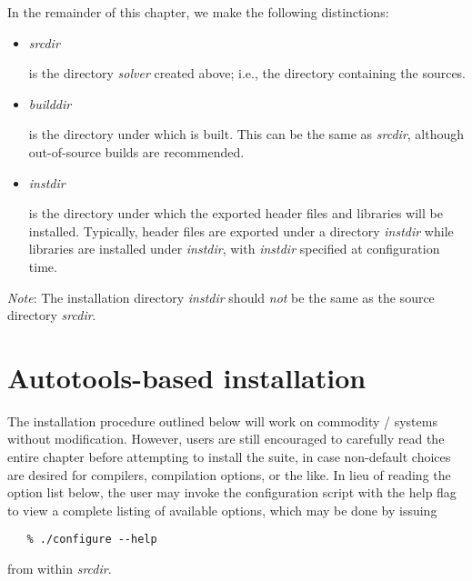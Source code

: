 \noindent In the remainder of this chapter, we make the following distinctions:
\begin{itemize}

\item {\em srcdir} 

  is the directory {\em solver} created above; i.e., the 
  directory containing the {\sundials} sources.

\item {\em builddir}

  is the directory under which {\sundials} is built. This can be the same as
  {\em srcdir}, although out-of-source builds are recommended.

\item {\em instdir}

  is the directory under which the {\sundials} exported header files
  and libraries will be installed. Typically, header files are exported under a directory
  {\em instdir} while libraries are installed under {\em instdir},
  with {\em instdir} specified at configuration time.

\end{itemize}
{\noindent}{\warn}{\em Note}: The installation directory {\em instdir} should {\em not} be the same as
the source directory {\em srcdir}.



\section{Autotools-based installation}



The installation procedure outlined below will work on commodity {\linux}/{\unix} 
systems without modification. However, users are still encouraged to carefully read 
the entire chapter before attempting to install the {\sundials} suite, in case
non-default choices are desired for compilers, compilation options, or the like.
In lieu of reading the option list below, the user may invoke the configuration
script with the help flag to view a complete listing of available options, which
may be done by issuing 
\begin{verbatim}
   % ./configure --help 
\end{verbatim}
from within {\em srcdir}.


